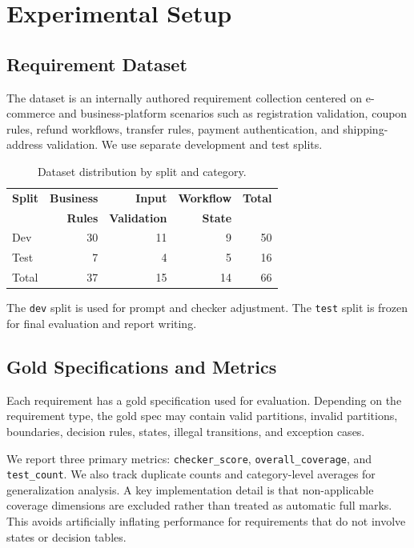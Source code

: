\documentclass{article}
\begin{document}
\section{Experimental Setup}

\subsection{Requirement Dataset}
The dataset is an internally authored requirement collection centered on e-commerce and business-platform scenarios such as registration validation, coupon rules, refund workflows, transfer rules, payment authentication, and shipping-address validation. We use separate development and test splits.

\begin{table}[h]
\centering
\small
\begin{tabular}{lrrrr}
\toprule
\textbf{Split} & \textbf{Business} & \textbf{Input} & \textbf{Workflow} & \textbf{Total} \\
 & \textbf{Rules} & \textbf{Validation} & \textbf{State} &  \\
\midrule
Dev & 30 & 11 & 9 & 50 \\
Test & 7 & 4 & 5 & 16 \\
Total & 37 & 15 & 14 & 66 \\
\bottomrule
\end{tabular}
\caption{Dataset distribution by split and category.}
\label{tab:dataset}
\end{table}

The \texttt{dev} split is used for prompt and checker adjustment. The \texttt{test} split is frozen for final evaluation and report writing.

\subsection{Gold Specifications and Metrics}
Each requirement has a gold specification used for evaluation. Depending on the requirement type, the gold spec may contain valid partitions, invalid partitions, boundaries, decision rules, states, illegal transitions, and exception cases.

We report three primary metrics: \texttt{checker\_score}, \texttt{overall\_coverage}, and \texttt{test\_count}. We also track duplicate counts and category-level averages for generalization analysis. A key implementation detail is that non-applicable coverage dimensions are excluded rather than treated as automatic full marks. This avoids artificially inflating performance for requirements that do not involve states or decision tables.
\end{document}
